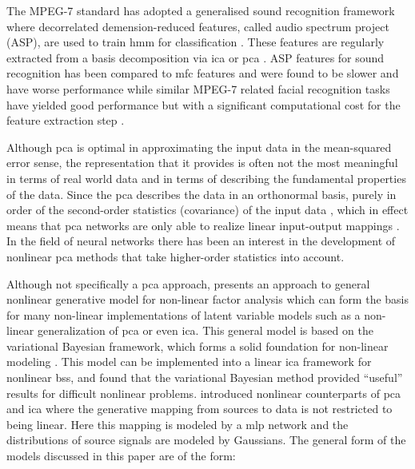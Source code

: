 The MPEG-7 standard \cite{Casey2001} has adopted a generalised sound recognition framework where decorrelated demension-reduced features, called audio spectrum project (ASP), are used to train \gls{hmm} for classification \cite{Kim2006}. These features are regularly extracted from a basis decomposition via \gls{ica} or \gls{pca} \cite{Casey2001}\cite{Kim2003}\cite{Kim2006}. ASP features for sound recognition has been compared to \gls{mfc} features and were found to be slower and have worse performance \cite{Kim2004} while similar MPEG-7 related facial recognition tasks have yielded good performance but with a significant computational cost for the feature extraction step \cite{Zaeri2006}.

Although \gls{pca} is optimal in approximating the input data in the mean-squared error sense, the representation that it provides is often not the most meaningful in terms of real world data and in terms of describing the fundamental properties of the data. Since the \gls{pca} describes the data in an orthonormal basis, purely in order of the second-order statistics (covariance) of the input data \citep{Oja1995}, which in effect means that \gls{pca} networks are only able to realize linear input-output mappings \citep{Karhunen1995}. In the field of neural networks there has been an interest in the development of nonlinear \gls{pca} methods that take higher-order statistics into account.

Although not specifically a \gls{pca} approach, \cite{Honkela2005} presents an approach to general nonlinear generative model for non-linear factor analysis which can form the basis for many non-linear implementations of latent variable models such as a non-linear generalization of \gls{pca} or even \gls{ica}. This general model is based on the variational Bayesian framework, which forms a solid foundation for non-linear modeling \citep{Honkela2005}. This model can be implemented into a linear \gls{ica} framework for nonlinear \gls{bss}, and \cite{Valpola2003} found that the variational Bayesian method provided ``useful'' results for difficult nonlinear problems. \citep{Lappalainen2000} introduced nonlinear counterparts of \gls{pca} and \gls{ica} where the generative mapping from sources to data is not restricted to being linear. Here this mapping is modeled by a \gls{mlp} network and the distributions of source signals are modeled by Gaussians. The general form of the models discussed in this paper are of the form:

